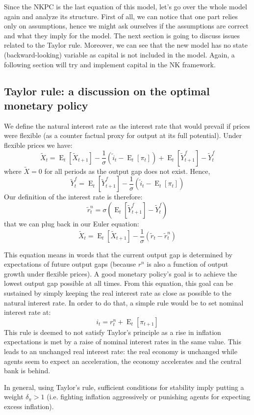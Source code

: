 \documentclass[12pt]{report}
\newcommand{\Et}[1]{\operatorname{E}_t\left[#1\right]}
\begin{document}
Since the NKPC is the last equation of this model, let's go over the whole model again and analyze its structure. First of all, we can notice that one part relies only on assumptions, hence we might ask ourselves if the assumptions are correct and what they imply for the model. The next section is going to discuss issues related to the Taylor rule. Moreover, we can see that the new model has no state (backward-looking) variable as capital is not included in the model. Again, a following section will try and implement capital in the NK framework.

\subsection{Taylor rule: a discussion on the optimal monetary policy}

We define the natural interest rate as the interest rate that would prevail if prices were flexible (as a counter factual proxy for output at its full potential). Under flexible prices we have: $$\tilde X_t = \Et{\tilde X_{t+1}} - \frac{1}{\sigma}(\tilde i_t - \Et{\pi_t}) + \Et{\tilde Y_{t+1}^f} - \tilde Y_t^f $$ where $\tilde X = 0$ for all periods as the output gap does not exist. Hence, $$\tilde Y_t^f = \Et{\tilde Y_{t+1}^f} - \frac{1}{\sigma}(\tilde i_t - \Et{\pi_t}) $$ Our definition of the interest rate is therefore: $$ \tilde r_t^n = \sigma \left(\Et{\tilde Y_{t+1}^f} - \tilde Y_t^f\right) $$ that we can plug back in our Euler equation: $$\tilde X_t = \Et{\tilde X_{t+1}} - \frac{1}{\sigma}(\tilde r_t - \tilde r_t^n) $$

This equation means in words that the current output gap is determined by expectations of future output gaps (because $r^n$ is also a function of output growth under flexible prices). A good monetary policy's goal is to achieve the lowest output gap possible at all times. From this equation, this goal can be sustained by simply keeping the real interest rate as close as possible to the natural interest rate. In order to do that, a simple rule would be to set nominal interest rate at: $$i_t = r_t^n + \Et{\pi_{t+1}} $$ This rule is deemed to not satisfy Taylor's principle as a rise in inflation expectations is met by a raise of nominal interest rates in the same value. This leads to an unchanged real interest rate: the real economy is unchanged while agents seem to expect an acceleration, the economy accelerates and the central bank is behind.

In general, using Taylor's rule, sufficient conditions for stability imply putting a weight $\delta_\pi > 1$ (i.e. fighting inflation aggressively or punishing agents for expecting excess inflation).
\end{document}
